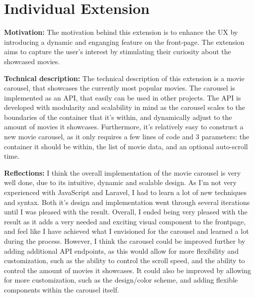 \documentclass[letterpaper,twocolumn]{article}
\begin{document}
\section{Individual Extension}
\textbf{Motivation:}
The motivation behind this extension is to enhance the UX by introducing a dynamic and enganging feature on the front-page. The extension aims to capture the user's interest by stimulating their curiosity about the showcased movies.

\textbf{Technical description:}
The technical description of this extension is a movie carousel, that showcases the currently most popular movies. 
The carousel is implemented as an API, that easily can be used in other projects. 
The API is developed with modularity and scalability in mind as the carousel scales to the boundaries of the container that it's within, and dynamically adjust to the amount of movies it showcases. 
Furthermore, it's relatively easy to construct a new movie carousel, as it only requires a few lines of code and 3 parameters: the container it should be within, the list of movie data, and an optional auto-scroll time.

\textbf{Reflections:}
I think the overall implementation of the movie carousel is very well done, due to its intuitive, dynamic and scalable design. 
As I'm not very experienced with JavaScript and Laravel, I had to learn a lot of new techniques and syntax. 
Both it's design and implementation went through several iterations until I was pleased with the result. 
Overall, I ended being very pleased with the result as it adds a very needed and exciting visual component to the frontpage, and feel like I have achieved what I envisioned for the carousel and learned a lot during the process.
However, I think the carousel could be improved further by adding additional API endpoints, as this would allow for more flexibility and customization, such as the ability to control the scroll speed, and the ability to control the amount of movies it showcases. 
It could also be improved by allowing for more customization, such as the design/color scheme, and adding flexible components within the carousel itself.
\end{document}
